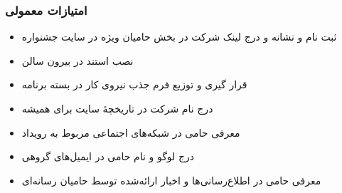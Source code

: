 \documentclass{article}
\begin{document}
\subsubsection{امتیازات معمولی}
\begin{flushright}

\begin{itemize}
\item ثبت نام و نشانه و درج لینک شرکت در بخش حامیان ویژه در سایت جشنواره
\item نصب استند در بیرون سالن
\item قرار گیری و توزیع فرم جذب نیروی کار در بسته برنامه
\item درج نام شرکت در تاریخچهٔ سایت برای همیشه
\item معرفی حامی در شبکه‌های اجتماعی مربوط به رویداد
\item درج لوگو و نام حامی در ایمیل‌های گروهی
\item معرفی حامی در اطلاع‌رسانی‌ها و اخبار ارائه‌شده توسط حامیان رسانه‌ای
\end{itemize}
\end{flushright}
\end{document}
